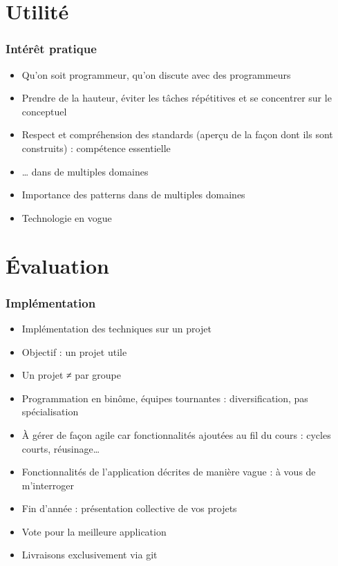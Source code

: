 \documentclass[english, french]{beamer}
\begin{document}
\section{Utilité}
\begin{frame}
	\frametitle{Intérêt pratique}
	\begin{itemize}
		\item Qu’on soit programmeur, qu’on discute avec des programmeurs
		\item Prendre de la hauteur, éviter les tâches répétitives et se concentrer sur le conceptuel
		\item Respect et compréhension des standards (aperçu de la façon dont ils sont construits) : compétence essentielle
		\item … dans de multiples domaines
		\item Importance des patterns dans de multiples domaines
		\item Technologie en vogue
	\end{itemize}
\end{frame}

\section{Évaluation}
\begin{frame}
	\frametitle{Implémentation}
	\begin{itemize}
		\item Implémentation des techniques sur un projet
		\item Objectif : un projet utile
		\item Un projet ≠ par groupe
		\item Programmation en binôme, équipes tournantes : diversification, pas spécialisation
		\item À gérer de façon agile car fonctionnalités ajoutées au fil du cours : cycles courts, réusinage…
		\item Fonctionnalités de l’application décrites de manière vague : à vous de m’interroger
		\item Fin d’année : présentation collective de vos projets
		\item Vote pour la meilleure application
		\item Livraisons exclusivement via git
	\end{itemize}
\end{frame}
\end{document}
